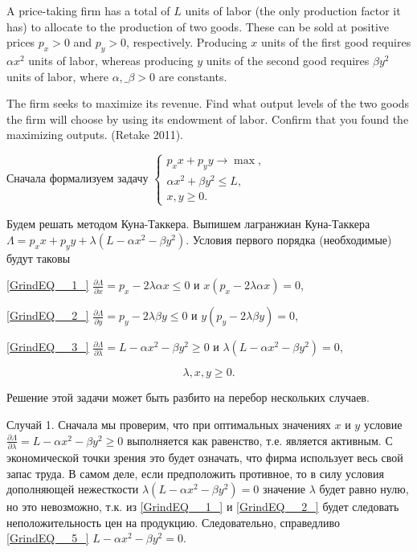 \begin{problem}
A price-taking firm has a total of $L$ units of labor (the only production factor it has) to allocate to the production of two goods. These can be sold at positive prices $p_{x} >0$ and $p_{y} >0$, respectively. Producing $x$ units of the first good requires $\alpha x^{2} $ units of labor, whereas producing  $y$ units of the second good requires $\beta y^{2} $ units of labor, where $\alpha ,\_ \beta >0$ are constants.

The firm seeks to maximize its revenue. Find what output levels of the two goods the firm will choose by using its endowment of labor. Confirm that you found the maximizing outputs. (Retake 2011).
\end{problem}

\begin{solution}
Сначала формализуем задачу $\left\{\begin{array}{c} {p_{x} x+p_{y} y\to \max ,} \\ {\alpha x^{2} +\beta y^{2} \le L,} \\ {x,y\ge 0.} \end{array}\right. $

Будем решать методом Куна-Таккера. Выпишем лагранжиан Куна-Таккера $\Lambda =p_{x} x+p_{y} y+\lambda (L-\alpha x^{2} -\beta y^{2} )$. Условия первого порядка (необходимые) будут таковы

\eqref{GrindEQ__1_}  $\frac{\partial \Lambda }{\partial x} =p_{x} -2\lambda \alpha x\le 0$ и $x(p_{x} -2\lambda \alpha x)=0$,

\eqref{GrindEQ__2_}  $\frac{\partial \Lambda }{\partial y} =p_{y} -2\lambda \beta y\le 0$ и $y(p_{y} -2\lambda \beta y)=0$,

\eqref{GrindEQ__3_}  $\frac{\partial \Lambda }{\partial \lambda } =L-\alpha x^{2} -\beta y^{2} \ge 0$ и $\lambda (L-\alpha x^{2} -\beta y^{2} )=0$,

\begin{equation} \label{GrindEQ__4_} \lambda ,x,y\ge 0. \end{equation} 

Решение этой задачи может быть разбито на перебор нескольких случаев.

Случай 1. Сначала мы проверим, что при оптимальных значениях $x$ и $y$ условие $\frac{\partial \Lambda }{\partial \lambda } =L-\alpha x^{2} -\beta y^{2} \ge 0$ выполняется как равенство, т.е. является активным. С экономической точки зрения это будет означать, что фирма использует весь свой запас труда. В самом деле, если предположить противное, то в силу условия дополняющей нежесткости $\lambda (L-\alpha x^{2} -\beta y^{2} )=0$ значение $\lambda $ будет равно нулю, но это невозможно, т.к. из \eqref{GrindEQ__1_} и \eqref{GrindEQ__2_} будет следовать неположительность цен на продукцию. Следовательно, справедливо \eqref{GrindEQ__5_}  $L-\alpha x^{2} -\beta y^{2} =0$.


\end{solution}
